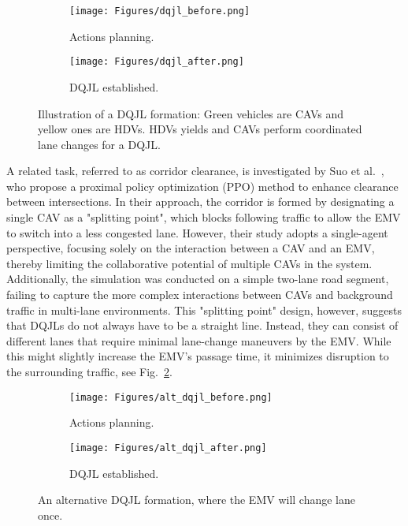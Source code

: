 \begin{figure}[htbp]
    \centering
    \begin{subfigure}{0.7\textwidth}
        \centering
        \texttt{[image: Figures/dqjl\_before.png]}
        \caption{Actions planning.}
    \end{subfigure}

    \vspace{0.2cm} %

    \begin{subfigure}{0.7\textwidth}
        \centering
        \texttt{[image: Figures/dqjl\_after.png]}
        \caption{DQJL established.}
    \end{subfigure}
    \caption{Illustration of a DQJL formation: Green vehicles are CAVs and yellow ones are HDVs. HDVs yields and CAVs perform coordinated lane changes for a DQJL.}
    \label{fig:dqjl}
\end{figure}

A related task, referred to as corridor clearance, is investigated by Suo et al.~\cite{suo2024model,liu2020rethinking}, who propose a proximal policy optimization (PPO) method to enhance clearance between intersections. In their approach, the corridor is formed by designating a single CAV as a "splitting point", which blocks following traffic to allow the EMV to switch into a less congested lane. However, their study adopts a single-agent perspective, focusing solely on the interaction between a CAV and an EMV, thereby limiting the collaborative potential of multiple CAVs in the system. Additionally, the simulation was conducted on a simple two-lane road segment, failing to capture the more complex interactions between CAVs and background traffic in multi-lane environments.
This "splitting point" design, however, suggests that DQJLs do not always have to be a straight line. Instead, they can consist of different lanes that require minimal lane-change maneuvers by the EMV. While this might slightly increase the EMV's passage time, it minimizes disruption to the surrounding traffic, see Fig.~\ref{fig:lane_change_dqjl}.

\begin{figure}[h]
    \centering
    \begin{subfigure}{0.7\textwidth}
        \centering
        \texttt{[image: Figures/alt\_dqjl\_before.png]}
        \caption{Actions planning.}
    \end{subfigure}

    \vspace{0.2cm} %

    \begin{subfigure}{0.7\textwidth}
        \centering
        \texttt{[image: Figures/alt\_dqjl\_after.png]}
        \caption{DQJL established.}
    \end{subfigure}
    \caption{An alternative DQJL formation, where the EMV will change lane once.}
    \label{fig:lane_change_dqjl}
\end{figure}


